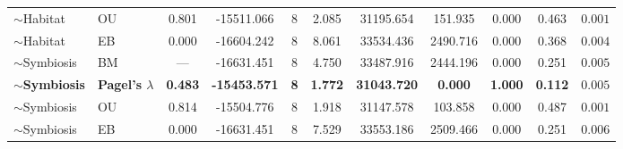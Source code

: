 \begin{table}
\begin{tabular}[t]{llccccccccc}
$\sim$Habitat & OU & 0.801 & -15511.066 & 8 & 2.085 & 31195.654 & 151.935 & 0.000 & 0.463 & $0.001$\\
$\sim$Habitat & EB & 0.000 & -16604.242 & 8 & 8.061 & 33534.436 & 2490.716 & 0.000 & 0.368 & $0.004$\\
$\sim$Symbiosis & BM & --- & -16631.451 & 8 & 4.750 & 33487.916 & 2444.196 & 0.000 & 0.251 & $0.005$\\
\textbf{$\sim$Symbiosis} & \textbf{Pagel's $\lambda$} & \textbf{0.483} & \textbf{-15453.571} & \textbf{8} & \textbf{1.772} & \textbf{31043.720} & \textbf{0.000} & \textbf{1.000} & \textbf{0.112} & \textbf{$0.005$}\\
\addlinespace
$\sim$Symbiosis & OU & 0.814 & -15504.776 & 8 & 1.918 & 31147.578 & 103.858 & 0.000 & 0.487 & $0.001$\\
$\sim$Symbiosis & EB & 0.000 & -16631.451 & 8 & 7.529 & 33553.186 & 2509.466 & 0.000 & 0.251 & $0.006$\\
\bottomrule
\end{tabular}
\end{table}